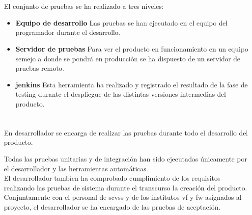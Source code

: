 \section{}

El conjunto de pruebas se ha realizado a tres niveles:
\begin{itemize}
    \item \textbf{Equipo de desarrollo} Las pruebas se han ejecutado en el equipo del programador durante el desarrollo.
    \item \textbf{Servidor de pruebas} Para ver el producto en funcionamiento en un equipo semejo a donde se pondrá en producción se ha dispuesto de un servidor de pruebas remoto.
    \item \textbf{\gls{jenkins}} Esta herramienta ha realizado y registrado el resultado de la fase de \gls{testing} durante el \gls{despliegue} de las distintas versiones intermedias del producto.
\end{itemize}

\section{}
En desarrollador se encarga de realizar las pruebas durante todo el desarrollo del producto. 

Todas las pruebas unitarias y de integración han sido ejecutadas únicamente por el desarrollador y las herramientas automáticas.\\

El desarrollador tambíen ha comprobado cumplimiento de los requisitos realizando las pruebas de sistema durante el transcurso la creación del producto.\\

Conjuntamente con el personal de \gls{scvss} y de los institutos \gls{vf} y \gls{fw} asignados al proyecto, el desarrollador se ha encargado de las pruebas de aceptación.

\section{}

